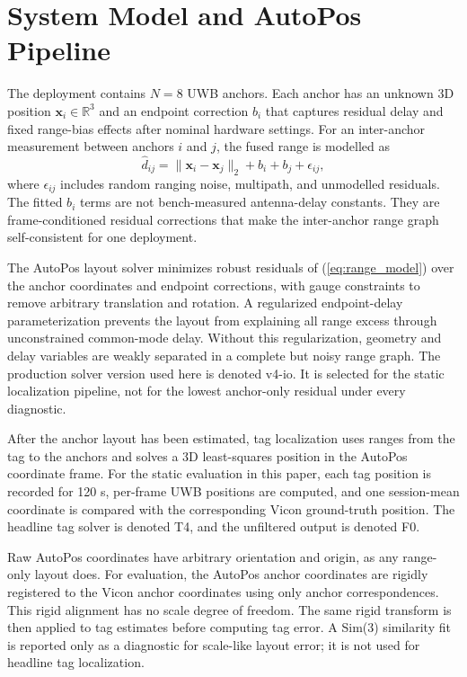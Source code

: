 \documentclass[journal,twoside,web]{ieeecolor}
\begin{document}
\section{System Model and AutoPos Pipeline}
\label{sec:system}

The deployment contains $N=8$ UWB anchors. Each anchor has an unknown 3D position $\mathbf{x}_i\in\mathbb{R}^3$ and an endpoint correction $b_i$ that captures residual delay and fixed range-bias effects after nominal hardware settings. For an inter-anchor measurement between anchors $i$ and $j$, the fused range is modelled as
\begin{equation}
\hat{d}_{ij} = \lVert \mathbf{x}_i-\mathbf{x}_j\rVert_2 + b_i + b_j + \epsilon_{ij},
\label{eq:range_model}
\end{equation}
where $\epsilon_{ij}$ includes random ranging noise, multipath, and unmodelled residuals. The fitted $b_i$ terms are not bench-measured antenna-delay constants. They are frame-conditioned residual corrections that make the inter-anchor range graph self-consistent for one deployment.

The AutoPos layout solver minimizes robust residuals of (\ref{eq:range_model}) over the anchor coordinates and endpoint corrections, with gauge constraints to remove arbitrary translation and rotation. A regularized endpoint-delay parameterization prevents the layout from explaining all range excess through unconstrained common-mode delay. Without this regularization, geometry and delay variables are weakly separated in a complete but noisy range graph. The production solver version used here is denoted v4-io. It is selected for the static localization pipeline, not for the lowest anchor-only residual under every diagnostic.

After the anchor layout has been estimated, tag localization uses ranges from the tag to the anchors and solves a 3D least-squares position in the AutoPos coordinate frame. For the static evaluation in this paper, each tag position is recorded for 120 s, per-frame UWB positions are computed, and one session-mean coordinate is compared with the corresponding Vicon ground-truth position. The headline tag solver is denoted T4, and the unfiltered output is denoted F0.

Raw AutoPos coordinates have arbitrary orientation and origin, as any range-only layout does. For evaluation, the AutoPos anchor coordinates are rigidly registered to the Vicon anchor coordinates using only anchor correspondences. This rigid alignment has no scale degree of freedom. The same rigid transform is then applied to tag estimates before computing tag error. A Sim(3) similarity fit is reported only as a diagnostic for scale-like layout error; it is not used for headline tag localization.
\end{document}
